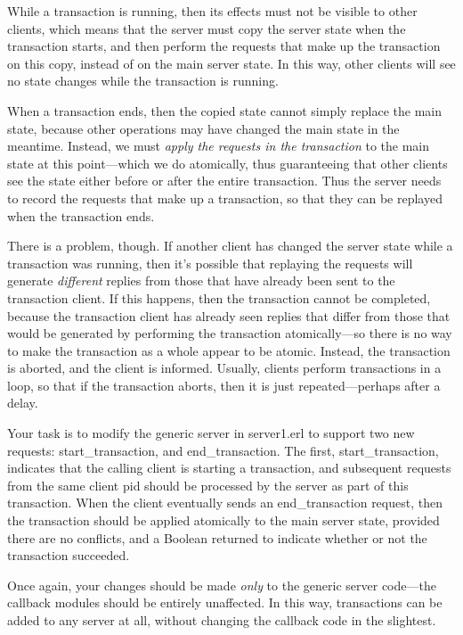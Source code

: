\documentclass{article}
\begin{document}
While a transaction is running, then its effects must not be visible
to other clients, which means that the server must copy the server
state when the transaction starts, and then perform the requests that
make up the transaction on this copy, instead of on the main server
state. In this way, other clients will see no state changes while the
transaction is running.


When a transaction ends, then the copied state cannot simply replace
the main state, because other operations may have changed the main
state in the meantime. Instead, we must \emph{apply the requests in the
transaction} to the main state at this point—which we do atomically,
thus guaranteeing that other clients see the state either before or
after the entire transaction.  Thus the server needs to record the
requests that make up a transaction, so that they can be replayed when
the transaction ends.

There is a problem, though. If another client has changed the server
state while a transaction was running, then it's possible that
replaying the requests will generate \emph{different} replies from those that
have already been sent to the transaction client. If this happens,
then the transaction cannot be completed, because the transaction
client has already seen replies that differ from those that would be
generated by performing the transaction atomically—so there is no way
to make the transaction as a whole appear to be atomic. Instead, the
transaction is aborted, and the client is informed. Usually, clients
perform transactions in a loop, so that if the transaction aborts,
then it is just repeated---perhaps after a delay.

Your task is to modify the generic server in \textsf{server1.erl} to support
two new requests: \textsf{start\_transaction}, and
\textsf{end\_transaction}. The first, \textsf{start\_transaction},
indicates that the calling client is starting a transaction, and
subsequent requests from the same client pid should be processed by
the server as part of this transaction. When the client eventually
sends an \textsf{end\_transaction} request, then the transaction
should be applied atomically to the main server state, provided there
are no conflicts, and a Boolean returned to indicate whether or not
the transaction succeeded.

Once again, your changes should be made \emph{only} to the generic server
code---the callback modules should be entirely unaffected. In this way,
transactions can be added to any server at all, without changing the
callback code in the slightest.
\end{document}
